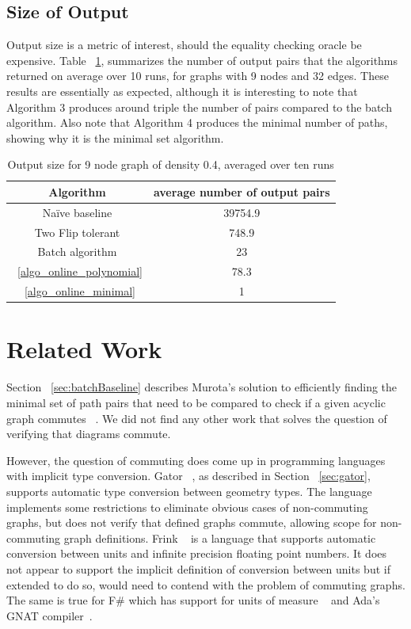 \documentclass[sigplan]{acmart}
\begin{document}
\subsection{Size of Output}
Output size is a metric of interest, should the equality checking oracle be expensive.
Table ~\ref{tab:sizes}, summarizes the number of output pairs that the algorithms returned on average over 10 runs, for graphs with 9 nodes and 32 edges.
These results are essentially as expected, although it is interesting to note that Algorithm 3 produces around triple the number of pairs compared to the batch algorithm.
Also note that Algorithm 4 produces the minimal number of paths, showing why it is the minimal set algorithm.

\begin{table}
    \caption{Output size for 9 node graph of density 0.4, averaged over ten runs}
\begin{tabular}{|c|c|}
    \hline
    Algorithm & average number of output pairs \\
    \hline
    Na\"{i}ve baseline & 39754.9 \\
    Two Flip tolerant & 748.9 \\
    Batch algorithm & 23 \\
    ~\ref{algo_online_polynomial} & 78.3 \\
    ~\ref{algo_online_minimal} & 1 \\
    \hline
\end{tabular}
\label{tab:sizes}
\end{table}

\section{Related Work}

Section ~\ref{sec:batchBaseline} describes Murota's solution to efficiently finding the minimal set of path pairs that need to be compared to check if a given acyclic graph commutes ~\cite{commutative}.
We did not find any other work that solves the question of verifying that diagrams commute.

However, the question of commuting does come up in programming languages with implicit type conversion.
Gator ~\cite{gator}, as described in Section ~\ref{sec:gator}, supports automatic type conversion between geometry types.
The language implements some restrictions to eliminate obvious cases of non-commuting graphs, but does not verify that defined graphs commute, allowing scope for non-commuting graph definitions.
Frink ~\cite{frink} is a language that supports automatic conversion between units and infinite precision floating point numbers.
It does not appear to support the implicit definition of conversion between units  but if extended to do so, would need to contend with the problem of commuting graphs.
The same is true for F\# which has support for units of measure ~\cite{unitsOfMeasure} and Ada's GNAT compiler~\cite{gnat}.
\end{document}

